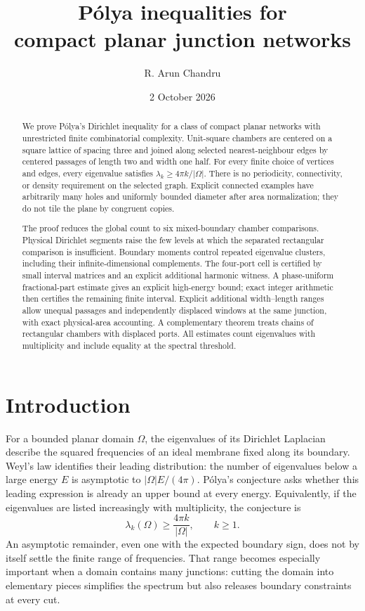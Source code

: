 \documentclass[11pt,reqno]{amsart}
\title[P\'olya inequalities for junction networks]{P\'olya inequalities for\\compact planar junction networks}
\author{R. Arun Chandru}
\date{2 October 2026}
\numberwithin{equation}{section}
\newcommand{\abs}[1]{\lvert#1\rvert}
\newcommand{\Om}{\Omega}
\begin{document}
\begin{abstract}
We prove P\'olya's Dirichlet inequality for a class of compact planar
networks with unrestricted finite combinatorial complexity. Unit-square
chambers are centered on a square lattice of spacing three and joined
along selected nearest-neighbour edges by centered passages of length
two and width one half. For every finite choice of vertices and edges,
every eigenvalue satisfies $\lambda_k\ge4\pi k/\abs{\Om}$. There is no
periodicity, connectivity, or density requirement on the selected graph.
Explicit connected examples have arbitrarily many holes and uniformly
bounded diameter after area normalization; they do not tile the plane
by congruent copies.

The proof reduces the global count to six mixed-boundary chamber
comparisons. Physical Dirichlet segments raise the few levels at which
the separated rectangular comparison is insufficient. Boundary moments control repeated eigenvalue clusters, including their
infinite-dimensional complements. The four-port cell is certified by
small interval matrices and an explicit additional harmonic witness. A phase-uniform fractional-part
estimate gives an explicit high-energy bound; exact integer arithmetic
then certifies the remaining finite interval. Explicit additional
width--length ranges allow unequal passages and independently displaced
windows at the same junction, with exact physical-area accounting.
A complementary theorem treats chains of rectangular chambers with
displaced ports. All estimates count eigenvalues with multiplicity and include
equality at the spectral threshold.
\end{abstract}
\maketitle
\tableofcontents

\section{Introduction}\label{sec:introduction}

For a bounded planar domain $\Om$, the eigenvalues of its Dirichlet
Laplacian describe the squared frequencies of an ideal membrane fixed
along its boundary. Weyl's law identifies their leading distribution:
the number of eigenvalues below a large energy $E$ is asymptotic to
$\abs{\Om}E/(4\pi)$. P\'olya's conjecture asks whether this leading
expression is already an upper bound at every energy. Equivalently,
if the eigenvalues are listed increasingly with multiplicity, the
conjecture is
\begin{equation}\label{eq:polya}
 \lambda_k(\Om)\ge\frac{4\pi k}{\abs{\Om}},\qquad k\ge1.
\end{equation}
An asymptotic remainder, even one with the expected boundary sign,
does not by itself settle the finite range of frequencies. That range
becomes especially important when a domain contains many junctions:
cutting the domain into elementary pieces simplifies the spectrum but
also releases boundary constraints at every cut.
\end{document}
